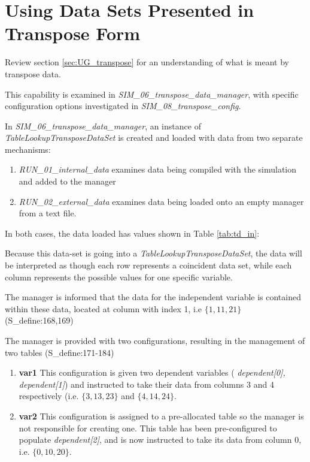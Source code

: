 \documentclass[11pt,fleqn]{report}
\begin{document}
\clearpage





\section{Using Data Sets Presented in Transpose Form}
Review section \ref{sec:UG_transpose} for an understanding of what is meant
by transpose data.

This capability is examined in \textit{SIM\_06\_transpose\_data\_manager},
with specific configuration options investigated in
\textit{SIM\_08\_transpose\_config}.

In \textit{SIM\_06\_transpose\_data\_manager}, an instance of
\textit{TableLookupTransposeDataSet} is created and
loaded with data from two separate mechanisms:
\begin{enumerate}
  \item \textit{RUN\_01\_internal\_data} examines data being compiled with
  the simulation and added to the manager
  \item \textit{RUN\_02\_external\_data} examines data being loaded onto an
  empty manager from a text file.
\end{enumerate}

In both cases, the data loaded has values shown in Table \ref{tab:td_in}:

Because this data-set is going into a \textit{TableLookupTransposeDataSet},
the data will be interpreted as though each row represents a coincident data
set, while each column represents the possible values for one specific
variable.

The manager is informed that the data for the independent variable is
contained within these data, located at column with index 1, i.e $\{1,11,21\}$
(S\_define:168,169)

The manager is provided with two configurations, resulting in the management
of two tables (S\_define:171-184)
\begin{enumerate}
  \item \textbf{var1} This configuration is given two dependent variables
  (\textit{ dependent[0], dependent[1]}) and instructed to take their data
  from columns 3 and 4 respectively (i.e. $\{3,13,23\}$
  and $\{4,14,24\}$.
  \item \textbf{var2}  This configuration is assigned to a pre-allocated
  table so the manager is not responsible for creating one.  This table has
  been pre-configured to populate \textit{dependent[2]}, and is now
  instructed to take its data from column 0, i.e. $\{0,10,20\}$.
\end{enumerate}
\end{document}
